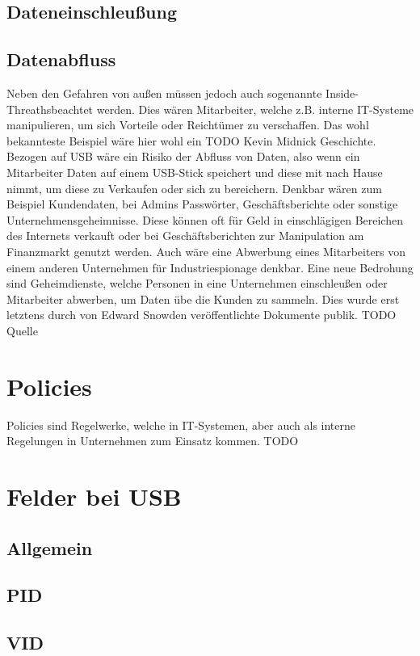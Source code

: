 \documentclass[a4paper,11pt,DIV=11,BROC=5mm,bigheadings,idxtotoc,cleardoubleempty,halfparskip,oneside,openright]{scrreprt} %
\begin{document}
			\section{Dateneinschleußung}

			
			\section{Datenabfluss}
Neben den Gefahren von außen müssen jedoch auch sogenannte \glqq Inside-Threaths\grqq beachtet werden. Dies wären Mitarbeiter, welche z.B. interne IT-Systeme manipulieren, um sich Vorteile oder Reichtümer zu verschaffen. Das wohl bekannteste Beispiel wäre hier wohl ein TODO Kevin Midnick Geschichte. Bezogen auf USB wäre ein Risiko der Abfluss von Daten, also wenn ein Mitarbeiter Daten auf einem USB-Stick speichert und diese mit nach Hause nimmt, um diese zu Verkaufen oder sich zu bereichern. Denkbar wären zum Beispiel Kundendaten, bei Admins Passwörter, Geschäftsberichte oder sonstige Unternehmensgeheimnisse. Diese können oft für Geld in einschlägigen Bereichen des Internets verkauft oder bei Geschäftsberichten zur Manipulation am Finanzmarkt genutzt werden. Auch wäre eine Abwerbung eines Mitarbeiters von einem anderen Unternehmen für Industriespionage denkbar.
Eine neue Bedrohung sind Geheimdienste, welche Personen in eine Unternehmen einschleußen oder Mitarbeiter abwerben, um Daten übe die Kunden zu sammeln. Dies wurde erst letztens durch von Edward Snowden veröffentlichte Dokumente publik. TODO Quelle

			\chapter{Policies} \label{Policies}
Policies sind Regelwerke, welche in IT-Systemen, aber auch als interne Regelungen in Unternehmen zum Einsatz kommen. TODO
						
			
			\chapter{Felder bei USB} \label{FelderUSB}
			\section{Allgemein}
			\section{PID}
			\section{VID}
			
\end{document}
